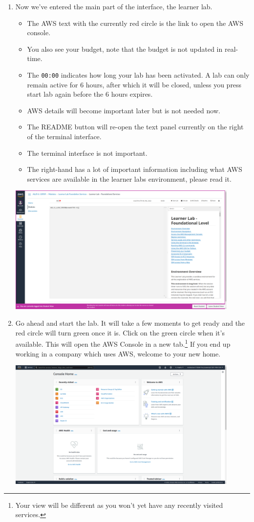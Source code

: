 \documentclass{csse4400}
\begin{document}
\begin{enumerate}
\item Now we've entered the main part of the interface, the learner lab.
\begin{itemize}
      \item The AWS text with the currently red circle is the link to open the AWS console.
      \item You also see your budget, note that the budget is not updated in real-time.
      \item The \texttt{00:00} indicates how long your lab has been activated.
      A lab can only remain active for 6 hours, after which it will be closed, unless you press start lab again before the 6 hours expires.
      \item AWS details will become important later but is not needed now.
      \item The README button will re-open the text panel currently on the right of the terminal interface.
      \item The terminal interface is not important.
      \item The right-hand has a lot of important information including what AWS services are available in the learner labs environment, please read it.
\end{itemize}

\includegraphics[width=0.9\textwidth]{images/lab-interface}

\item Go ahead and start the lab. It will take a few moments to get ready and the red circle will turn green once it is.
      Click on the green circle when it's available.
      This will open the AWS Console in a new tab.\footnote{Your view will be different as you won't yet have any recently visited services.}
      If you end up working in a company which uses AWS, welcome to your new home.

\includegraphics[width=0.9\textwidth]{images/aws-console}


\end{enumerate}
\end{document}
